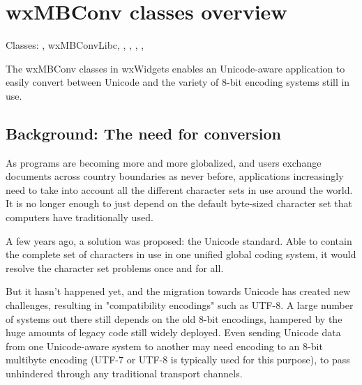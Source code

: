 
\section{wxMBConv classes overview}\label{mbconvclasses}

Classes: , wxMBConvLibc, 
, , 
,
, 

The wxMBConv classes in wxWidgets enables an Unicode-aware application to
easily convert between Unicode and the variety of 8-bit encoding systems still
in use.

\subsection{Background: The need for conversion}\label{needforconversion}

As programs are becoming more and more globalized, and users exchange documents
across country boundaries as never before, applications increasingly need to
take into account all the different character sets in use around the world. It
is no longer enough to just depend on the default byte-sized character set that
computers have traditionally used.

A few years ago, a solution was proposed: the Unicode standard. Able to contain
the complete set of characters in use in one unified global coding system,
it would resolve the character set problems once and for all.

But it hasn't happened yet, and the migration towards Unicode has created new
challenges, resulting in "compatibility encodings" such as UTF-8. A large
number of systems out there still depends on the old 8-bit encodings, hampered
by the huge amounts of legacy code still widely deployed. Even sending
Unicode data from one Unicode-aware system to another may need encoding to an
8-bit multibyte encoding (UTF-7 or UTF-8 is typically used for this purpose), to
pass unhindered through any traditional transport channels.

